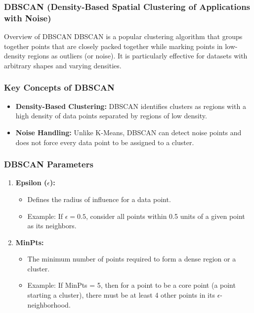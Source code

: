 \documentclass[aspectratio=169]{beamer}
\begin{document}
\begin{frame}[fragile]
    \frametitle{DBSCAN (Density-Based Spatial Clustering of Applications with Noise)}
    \begin{block}{Overview of DBSCAN}
        DBSCAN is a popular clustering algorithm that groups together points that are closely packed together while marking points in low-density regions as outliers (or noise). 
        It is particularly effective for datasets with arbitrary shapes and varying densities.
    \end{block}
\end{frame}

\begin{frame}[fragile]
    \frametitle{Key Concepts of DBSCAN}
    \begin{itemize}
        \item \textbf{Density-Based Clustering:} DBSCAN identifies clusters as regions with a high density of data points separated by regions of low density.
        \item \textbf{Noise Handling:} Unlike K-Means, DBSCAN can detect noise points and does not force every data point to be assigned to a cluster.
    \end{itemize}
\end{frame}

\begin{frame}[fragile]
    \frametitle{DBSCAN Parameters}
    \begin{enumerate}
        \item \textbf{Epsilon ($\epsilon$):}
        \begin{itemize}
            \item Defines the radius of influence for a data point.
            \item Example: If $\epsilon = 0.5$, consider all points within 0.5 units of a given point as its neighbors.
        \end{itemize}

        \item \textbf{MinPts:}
        \begin{itemize}
            \item The minimum number of points required to form a dense region or a cluster.
            \item Example: If MinPts = 5, then for a point to be a core point (a point starting a cluster), there must be at least 4 other points in its $\epsilon$-neighborhood.
        \end{itemize}
    \end{enumerate}
\end{frame}
\end{document}
